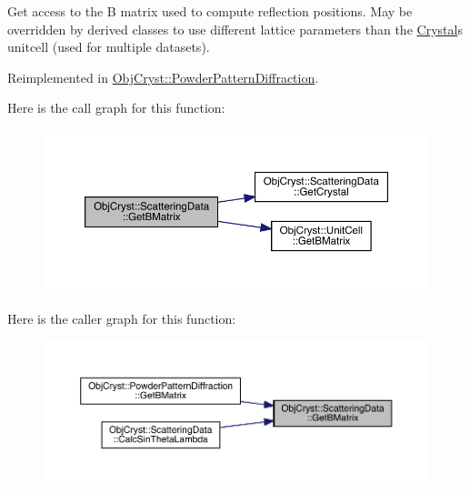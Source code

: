 Get access to the B matrix used to compute reflection positions. May be overridden by derived classes to use different lattice parameters than the \mbox{\hyperlink{class_obj_cryst_1_1_crystal}{Crystal}}\textquotesingle{}s unitcell (used for multiple datasets). 

Reimplemented in \mbox{\hyperlink{class_obj_cryst_1_1_powder_pattern_diffraction_ac2079a53e2f3655ea04aa79474dfb970}{Obj\+Cryst\+::\+Powder\+Pattern\+Diffraction}}.

Here is the call graph for this function\+:
\nopagebreak
\begin{figure}[H]
\begin{center}
\leavevmode
\includegraphics[width=350pt]{class_obj_cryst_1_1_scattering_data_abd28bb9c58ba25cc61cb138cab3df5de_cgraph}
\end{center}
\end{figure}
Here is the caller graph for this function\+:
\nopagebreak
\begin{figure}[H]
\begin{center}
\leavevmode
\includegraphics[width=350pt]{class_obj_cryst_1_1_scattering_data_abd28bb9c58ba25cc61cb138cab3df5de_icgraph}
\end{center}
\end{figure}
\mbox{\label{class_obj_cryst_1_1_scattering_data_a22249caed3843cadff97963de59ff444}} 
